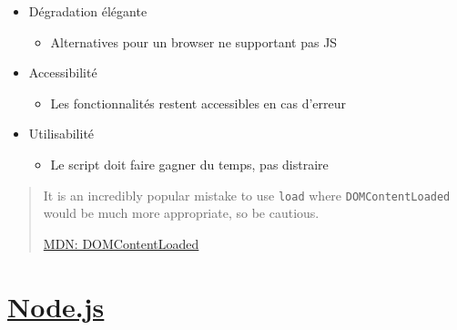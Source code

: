 \begin{itemize}
\tightlist
\item
  Dégradation élégante

  \begin{itemize}
  \tightlist
  \item
    Alternatives pour un browser ne supportant pas JS
  \end{itemize}
\item
  Accessibilité

  \begin{itemize}
  \tightlist
  \item
    Les fonctionnalités restent accessibles en cas d'erreur
  \end{itemize}
\item
  Utilisabilité

  \begin{itemize}
  \tightlist
  \item
    Le script doit faire gagner du temps, pas distraire
  \end{itemize}
\end{itemize}

\begin{quote}
It is an incredibly popular mistake to use \textenglish{\texttt{load}}
where \textenglish{\texttt{DOMContentLoaded}} would be much more
appropriate, so be cautious.

\href{https://developer.mozilla.org/en/docs/Web/Events/DOMContentLoaded}{MDN:
DOMContentLoaded}
\end{quote}

\hypertarget{node.js}{%
\section{\texorpdfstring{\href{https://nodejs.org}{Node.js}}{Node.js}}\label{node.js}}

